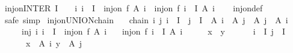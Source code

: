 \begin{isabellebody}
\ inj{\isacharunderscore}{\kern0pt}on{\isacharunderscore}{\kern0pt}INTER{\isacharcolon}{\kern0pt}\ {\isachardoublequoteopen}I\ {\isasymnoteq}\ {\isacharbraceleft}{\kern0pt}{\isacharbraceright}{\kern0pt}\ {\isasymLongrightarrow}\ {\isacharparenleft}{\kern0pt}{\isasymAnd}i{\isachardot}{\kern0pt}\ i\ {\isasymin}\ I\ {\isasymLongrightarrow}\ inj{\isacharunderscore}{\kern0pt}on\ f\ {\isacharparenleft}{\kern0pt}A\ i{\isacharparenright}{\kern0pt}{\isacharparenright}{\kern0pt}\ {\isasymLongrightarrow}\ inj{\isacharunderscore}{\kern0pt}on\ f\ {\isacharparenleft}{\kern0pt}{\isasymInter}i\ {\isasymin}\ I{\isachardot}{\kern0pt}\ A\ i{\isacharparenright}{\kern0pt}{\isachardoublequoteclose}\isanewline
%
\isadelimproof
\ \ %
\endisadelimproof
%
\isatagproof
{}\isamarkupfalse%
\ inj{\isacharunderscore}{\kern0pt}on{\isacharunderscore}{\kern0pt}def\ \isamarkupfalse%
\ safe\ simp%
\endisatagproof
{\isafoldproof}%
%
\isadelimproof
\isanewline
%
\endisadelimproof
\isanewline
{}\isamarkupfalse%
\ inj{\isacharunderscore}{\kern0pt}on{\isacharunderscore}{\kern0pt}UNION{\isacharunderscore}{\kern0pt}chain{\isacharcolon}{\kern0pt}\isanewline
\ \ \ chain{\isacharcolon}{\kern0pt}\ {\isachardoublequoteopen}{\isasymAnd}i\ j{\isachardot}{\kern0pt}\ i\ {\isasymin}\ I\ {\isasymLongrightarrow}\ j\ {\isasymin}\ I\ {\isasymLongrightarrow}\ A\ i\ {\isasymle}\ A\ j\ {\isasymor}\ A\ j\ {\isasymle}\ A\ i{\isachardoublequoteclose}\isanewline
\ \ \ \ \ inj{\isacharcolon}{\kern0pt}\ {\isachardoublequoteopen}{\isasymAnd}i{\isachardot}{\kern0pt}\ i\ {\isasymin}\ I\ {\isasymLongrightarrow}\ inj{\isacharunderscore}{\kern0pt}on\ f\ {\isacharparenleft}{\kern0pt}A\ i{\isacharparenright}{\kern0pt}{\isachardoublequoteclose}\isanewline
\ \ \ {\isachardoublequoteopen}inj{\isacharunderscore}{\kern0pt}on\ f\ {\isacharparenleft}{\kern0pt}{\isasymUnion}i\ {\isasymin}\ I{\isachardot}{\kern0pt}\ A\ i{\isacharparenright}{\kern0pt}{\isachardoublequoteclose}\isanewline
%
\isadelimproof
%
\endisadelimproof
%
\isatagproof
{}\isamarkupfalse%
\ {\isacharminus}{\kern0pt}\isanewline
\ \ \isamarkupfalse%
\ {\isachardoublequoteopen}x\ {\isacharequal}{\kern0pt}\ y{\isachardoublequoteclose}\isanewline
\ \ \ \ \ {\isacharasterisk}{\kern0pt}{\isacharcolon}{\kern0pt}\ {\isachardoublequoteopen}i\ {\isasymin}\ I{\isachardoublequoteclose}\ {\isachardoublequoteopen}j\ {\isasymin}\ I{\isachardoublequoteclose}\isanewline
\ \ \ \ \ {\isacharasterisk}{\kern0pt}{\isacharasterisk}{\kern0pt}{\isacharcolon}{\kern0pt}\ {\isachardoublequoteopen}x\ {\isasymin}\ A\ i{\isachardoublequoteclose}\ {\isachardoublequoteopen}y\ {\isasymin}\ A\ j{\isachardoublequoteclose}\isanewline

\end{isabellebody}
